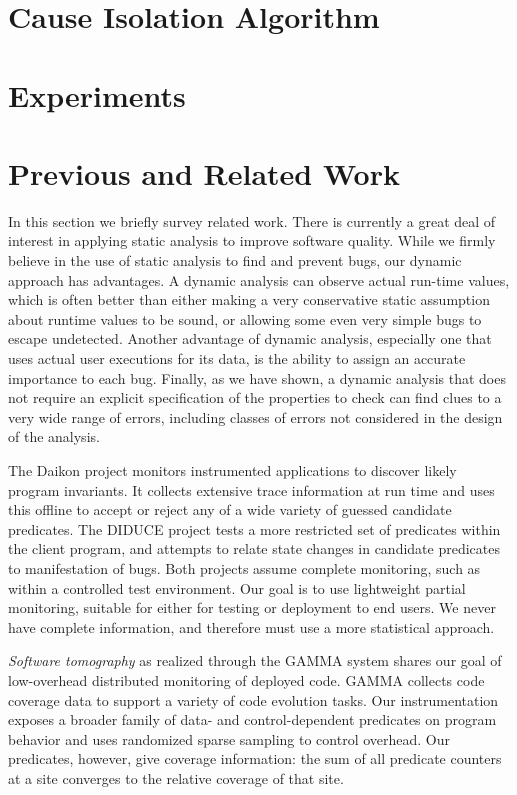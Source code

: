 \documentclass[draft]{sig-alternate}
\newcommand{\termdef}[1]{\textit{#1}}
\begin{document}
\section{Cause Isolation Algorithm}
\label{sec:algorithm}


\section{Experiments}
\label{sec:experiments}




\section{Previous and Related Work}
\label{sec:related-work}

In this section we briefly survey related work. There is currently a
great deal of interest in applying static analysis to improve software
quality.  While we firmly believe in the use of static analysis to
find and prevent bugs, our dynamic approach has advantages. A dynamic
analysis can observe actual run-time values, which is often better
than either making a very conservative static assumption about runtime
values to be sound, or allowing some even very simple bugs to escape
undetected.  Another advantage of dynamic analysis, especially one
that uses actual user executions for its data, is the ability to
assign an accurate importance to each bug.  Finally, as we have shown,
a dynamic analysis that does not require an explicit specification of
the properties to check can find clues to a very wide range of errors,
including classes of errors not considered in the design of the
analysis.
  
The Daikon project \cite{ernst2001} monitors instrumented applications
to discover likely program invariants.  It collects extensive trace
information at run time and uses this offline to accept or reject any
of a wide variety of guessed candidate predicates.  The DIDUCE project
\cite{ICSE02*291} tests a more restricted set of predicates within the
client program, and attempts to relate state changes in candidate
predicates to manifestation of bugs.  Both projects assume complete
monitoring, such as within a controlled test environment.  Our goal is
to use lightweight partial monitoring, suitable for either for testing
or deployment to end users.  We never have complete information, and
therefore must use a more statistical approach.

\termdef{Software tomography} as realized through the GAMMA system
\cite{PASTE'02*2,Orso:2003:LFDIART} shares our goal of low-overhead
distributed monitoring of deployed code.  GAMMA collects code coverage
data to support a variety of code evolution tasks.  Our
instrumentation exposes a broader family of data- and
control-dependent predicates on program behavior and uses randomized
sparse sampling to control overhead.  Our
predicates, however, give coverage information: the sum of all predicate counters at a site converges to the relative coverage of that site.
\end{document}
